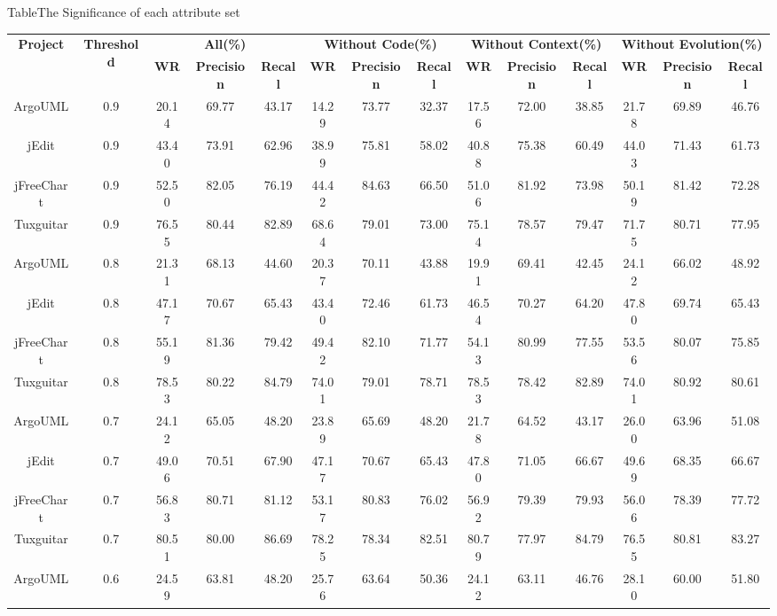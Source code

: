 {\begin{table}[htbp]
{Table$\!$}{The Significance of each attribute set}
\vspace{0.5em}\centering\wuhao
\begin{tabular}{cccccccccccccc}
\toprule[1.5pt]
\multirow{2}{*}{\textbf{Project}}&\multirow{2}{*}{\textbf{Threshold}}&\multicolumn{3}{c}{\textbf{All(\%)}}&\multicolumn{3}{c}{\textbf{Without Code(\%)}}&\multicolumn{3}{c}{\textbf{Without Context(\%)}}&\multicolumn{3}{c}{\textbf{Without Evolution(\%)}}\\
\cline{3-14}
&&\textbf{WR}&\textbf{Precision}&\textbf{Recall}&\textbf{WR}&\textbf{Precision}&\textbf{Recall}&\textbf{WR}&\textbf{Precision}&\textbf{Recall}&\textbf{WR}&\textbf{Precision}&\textbf{Recall}\\
\midrule[1pt]
ArgoUML&0.9&20.14&	69.77&	43.17&14.29&	73.77&	32.37&17.56&	72.00&	38.85&21.78&	69.89&	46.76\\
jEdit&0.9&	43.40&	73.91&	62.96&	38.99&	75.81&	58.02&	40.88&	75.38&	60.49&	44.03&	71.43&	61.73\\
jFreeChart&0.9&	52.50&	82.05&	76.19&	44.42&	84.63&	66.50&	51.06&	81.92&	73.98&	50.19&	81.42&	72.28\\
Tuxguitar&0.9&	76.55&	80.44&	82.89&	68.64&	79.01&	73.00&	75.14&	78.57&	79.47&	71.75&	80.71&	77.95\\
ArgoUML&0.8&	21.31&	68.13&	44.60&	20.37&	70.11&	43.88&	19.91&	69.41&	42.45&	24.12&	66.02&	48.92\\
jEdit&0.8&	47.17&	70.67&	65.43&	43.40&	72.46&	61.73&	46.54&	70.27&	64.20&	47.80&	69.74&	65.43\\
jFreeChart&0.8&	55.19&	81.36&	79.42&	49.42&	82.10&	71.77&	54.13&	80.99&	77.55&	53.56&	80.07&	75.85\\
Tuxguitar&0.8&	78.53&	80.22&	84.79&	74.01&	79.01&	78.71&	78.53&	78.42&	82.89&	74.01&	80.92&	80.61\\
ArgoUML&0.7&	24.12&	65.05&	48.20&	23.89&	65.69&	48.20&	21.78&	64.52&	43.17&	26.00&	63.96&	51.08\\
jEdit&0.7&	49.06&	70.51&	67.90&	47.17&	70.67&	65.43&	47.80&	71.05&	66.67&	49.69&	68.35&	66.67\\
jFreeChart&0.7&	56.83&	80.71&	81.12&	53.17&	80.83&	76.02&	56.92&	79.39&	79.93&	56.06&	78.39&	77.72\\
Tuxguitar&0.7&	80.51&	80.00&	86.69&	78.25&	78.34&	82.51&	80.79&	77.97&	84.79&	76.55&	80.81&	83.27\\
ArgoUML&0.6&	24.59&	63.81&	48.20&	25.76&	63.64&	50.36&	24.12&	63.11&	46.76&	28.10&	60.00&	51.80\\

\end{tabular}
\end{table}}
